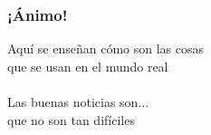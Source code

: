 


\begin{frame}
\frametitle{¡Ánimo!}

\begin{center}
{\huge Aquí se enseñan cómo son las cosas \\
  que se usan en el mundo real \\
  ~ \\
  Las buenas noticias son... \\
  que no son tan difíciles\\}
\end{center}

\end{frame}


